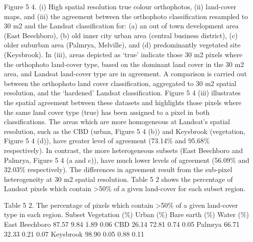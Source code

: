 \documentclass[]{book}
\begin{document}
Figure 5 4. (i) High spatial resolution true colour orthophotos, (ii)
land-cover maps, and (iii) the agreement between the orthophoto
classification resampled to 30 m2 and the Landsat classification for:
(a) an out of town development area (East Beechboro), (b) old inner city
urban area (central business district), (c) older suburban area
(Palmrya, Melville), and (d) predominantly vegetated site (Keysbrook).
In (iii), areas depicted as `true' indicate those 30 m2 pixels where the
orthophoto land-cover type, based on the dominant land cover in the 30
m2 area, and Landsat land-cover type are in agreement. A comparison is
carried out between the orthophoto land cover classification, aggregated
to 30 m2 spatial resolution, and the `hardened' Landsat classification.
Figure 5 4 (iii) illustrates the spatial agreement between these
datasets and highlights those pixels where the same land cover type
(true) has been assigned to a pixel in both classifications. The areas
which are more homogeneous at Landsat's spatial resolution, such as the
CBD (urban, Figure 5 4 (b)) and Keysbrook (vegetation, Figure 5 4 (d)),
have greater level of agreement (73.14\% and 95.68\% respectively). In
contrast, the more heterogeneous subsets (East Beechboro and Palmrya,
Figure 5 4 (a and c)), have much lower levels of agreement (56.09\% and
32.03\% respectively). The differences in agreement result from the
sub-pixel heterogeneity at 30 m2 spatial resolution. Table 5 2 shows the
percentage of Landsat pixels which contain \textgreater{}50\% of a given
land-cover for each subset region.

Table 5 2. The percentage of pixels which contain \textgreater{}50\% of
a given land-cover type in each region. Subset Vegetation (\%) Urban
(\%) Bare earth (\%) Water (\%) East Beechboro 87.57 9.84 1.89 0.06 CBD
26.14 72.81 0.74 0.05 Palmrya 66.71 32.33 0.21 0.07 Keysbrook 98.90 0.05
0.88 0.11
\end{document}
